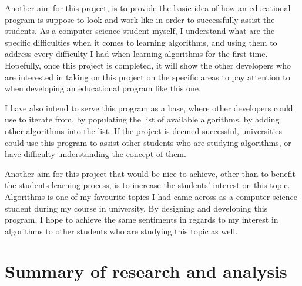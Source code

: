 Another aim for this project, is to provide the basic idea of how an educational program is suppose to look and work like in order to successfully assist the students. As a computer science student myself, I understand what are the specific difficulties when it comes to learning algorithms, and using them to address every difficulty I had when learning algorithms for the first time. Hopefully, once this project is completed, it will show the other developers who are interested in taking on this project on the specific areas to pay attention to when developing an educational program like this one. 

I have also intend to serve this program as a base, where other developers could use to iterate from, by populating the list of available algorithms, by adding other algorithms into the list. If the project is deemed successful, universities could use this program to assist other students who are studying algorithms, or have difficulty understanding the concept of them.

Another aim for this project that would be nice to achieve, other than to benefit the students learning process, is to increase the students' interest on this topic. Algorithms is one of my favourite topics I had came across as a computer science student during my course in university. By designing and developing this program, I hope to achieve the same sentiments in regards to my interest in algorithms to other students who are studying this topic as well.

\section{Summary of research and analysis}
